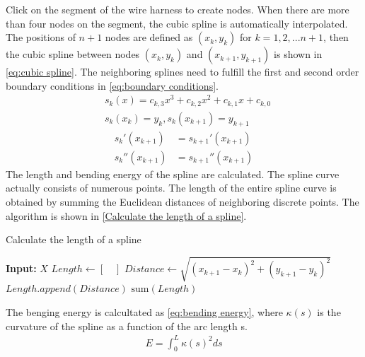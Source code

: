     Click on the segment of the wire harness to create nodes. When there are more than four nodes on the segment, the cubic spline is 
    automatically interpolated. The positions of $n+1$ nodes are defined as $(x_k, y_k)$ for $k = 1, 2, ...n+1$, then the cubic spline between nodes $(x_k, y_k)$ and $(x_{k+1}, y_{k+1})$ is shown in
    \autoref{eq:cubic spline}. The neighboring splines need to fulfill the first and second order boundary conditions in \autoref{eq:boundary conditions}. 
    \begin{equation}
        \begin{aligned}
            &s_k(x) =  c_{k,3}x^3+c_{k,2}x^2+c_{k,1}x+c_{k,0}\\
            &s_k(x_k) = y_k,  s_k(x_{k+1}) = y_{k+1}
            \label{eq:cubic spline}
        \end{aligned}
    \end{equation}
    \begin{equation}
        \begin{aligned}
            s_k'(x_{k+1}) &= s_{k+1}'(x_{k+1})\\
            s_k''(x_{k+1}) &= s_{k+1}''(x_{k+1})
            \label{eq:boundary conditions}
        \end{aligned}
    \end{equation}
    The length and bending energy of the spline are calculated. The spline curve actually consists of numerous points.  The length of the entire spline curve 
    is obtained by summing the Euclidean distances of neighboring discrete points. The algorithm is shown in \autoref{Calculate the length of a spline}.
    \begin{algorithm} 
        \caption{Calculate the length of a spline}
        \label{Calculate the length of a spline}
        \begin{algorithmic}[1]
        \STATE \textbf{Input:} $X$
        \STATE $Length \leftarrow [\quad]$
            \STATE $Distance \leftarrow \sqrt{(x_{k+1}-x_{k})^2+(y_{k+1}-y_{k})^2}$
            \STATE $Length.append(Distance)$
        \ENDFOR
        \RETURN $\text{sum}(Length)$
        \end{algorithmic}
    \end{algorithm}
    The benging energy is calcultated as \autoref{eq:bending energy}, where $\kappa(s)$ is the curvature of the spline as a function of the arc length s.
    \begin{equation}
        \begin{aligned}
            E = \int_{0}^{L} \kappa(s)^2ds
            \label{eq:bending energy}
        \end{aligned}
    \end{equation}
